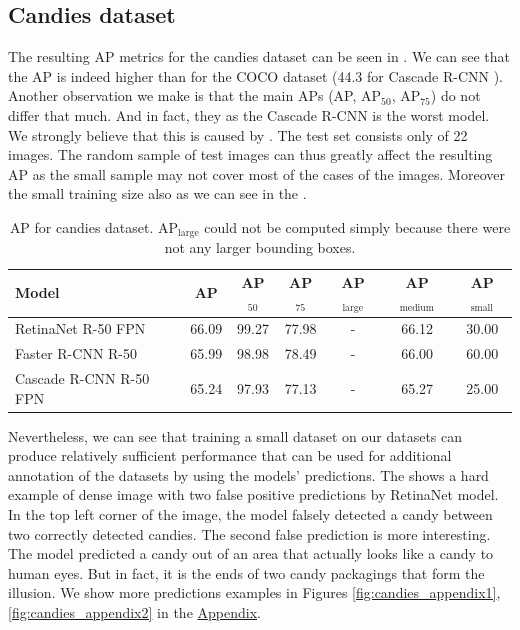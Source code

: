 \subsection*{Candies dataset}
The resulting AP metrics for the candies dataset can be seen in
. We can see that the AP is indeed higher than for the COCO
dataset (44.3 for Cascade R-CNN \cite{detectron}). Another observation we make
is that the main APs (AP, AP$_{50}$, AP$_{75}$) do not differ that much. And
in fact, they  as the Cascade R-CNN is
the worst model. We strongly believe that this is caused by . The test set consists only of 22 images. The random sample of
test images can thus greatly affect the resulting AP as the small sample may not
cover most of the cases of the images. Moreover the small training size also
 as we can see in the .

\begin{table}[H]
	\centering
	\begin{tabular}{l|c|c|c|c|c|c}
		Model                  & AP    & AP$_{50}$ & AP$_{75}$ & AP$_\text{large}$ & AP$_\text{medium}$ & AP$_\text{small}$ \\
		\hline
		RetinaNet R-50 FPN     & 66.09 & 99.27     & 77.98     & -                 & 66.12              & 30.00             \\
		Faster R-CNN R-50      & 65.99 & 98.98     & 78.49     & -                 & 66.00              & 60.00             \\
		Cascade R-CNN R-50 FPN & 65.24 & 97.93     & 77.13     & -                 & 65.27              & 25.00
	\end{tabular}
	\caption{AP for candies dataset. AP$_\text{large}$ could not be computed
		simply because there were not any larger bounding boxes.}
	\label{tab:candies}
\end{table}

Nevertheless, we can see that training a small dataset on our datasets can
produce relatively sufficient performance that can be used for additional
annotation of the datasets by using the models' predictions. The
 shows a hard example of dense image with two false
positive predictions by RetinaNet model. In the top left corner of the image,
the model falsely detected a candy between two correctly detected candies. The
second false prediction is more interesting. The model predicted a candy out of
an area that actually looks like a candy to human eyes. But in fact, it is
the ends of two candy packagings that form the illusion. We show more
predictions examples in Figures \ref{fig:candies_appendix1},
\ref{fig:candies_appendix2} in the \hyperref[appendix]{Appendix}.

